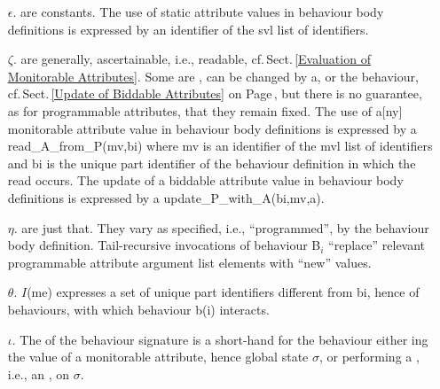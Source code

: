 \begin{itemize}
\item [$\epsilon$.]  are constants. The use of static
  attribute values in behaviour body definitions is expressed by an
  identifier of the \textsf{svl} list of identifiers.
\item [$\zeta$.]  are generally, 
          ascertainable, i.e., readable, cf.\,Sect.\,\vref{Evaluation
          of Monitorable Attributes}. 
          Some are , can be changed by a, or the
          behaviour, cf.\,Sect.\,\ref{Update of Biddable Attributes}
          on Page\,\pageref{Update of Biddable Attributes},
          but there is no guarantee, as for programmable 
          attributes, that they remain fixed.
          \pos{\vspace*{1mm}}{}
\begynd
\pind   The use of a[ny] monitorable
  attribute value in behaviour body definitions is expressed by a \textsf{read\_A\_from\_P(mv,bi)}
  where \textsf{mv} is an identifier of the \textsf{mvl} list of
          identifiers and \textsf{bi} is the unique part identifier of
          the behaviour definition in which the \textsf{read} occurs.
\pind  The update of a biddable attribute value  in behaviour body
          definitions is expressed by a
          \textsf{update\_P\_with\_A(bi,mv,a)}.
\afslut
\mnewfoil
\item [$\eta$.]  are just that. They
  vary as specified, i.e., ``programmed'', by the behaviour body
  definition. Tail-recursive invocations of behaviour \textsf{B$_i$}
  ``replace'' relevant programmable attribute argument list elements
  with ``new'' values.
\item [$\theta$.]  \textsf{$I$(me)} expresses a set of unique
  part identifiers different from \textsf{bi}, hence of behaviours,
  with which behaviour \textsf{b(i)} interacts.
\item [$\iota$.] The  of the behaviour signature is a short-hand
  for the behaviour either ing the value of a monitorable 
  attribute, hence global state $\sigma$, or performing a
  , i.e., an , on $\sigma$. 
\end{itemize}

\label{Action and Event Description.ii}

